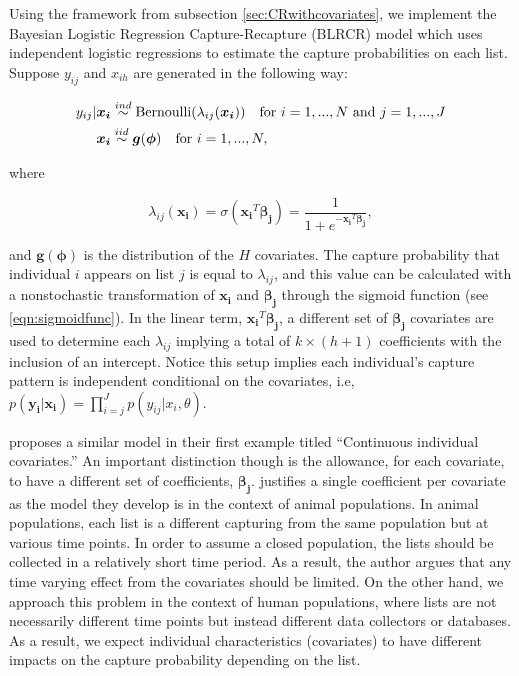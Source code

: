 \documentclass[
  12pt,
]{article}
\begin{document}
Using the framework from subsection \ref{sec:CRwithcovariates}, we
implement the Bayesian Logistic Regression Capture-Recapture (BLRCR)
model which uses independent logistic regressions to estimate the
capture probabilities on each list. Suppose \(y_{ij}\) and \(x_{ih}\)
are generated in the following way:

\begin{align} 
\label{eqn:logitdatacreation}
y_{ij}|\boldsymbol{x_i}& \stackrel{ind}{\sim} \text{Bernoulli}(\lambda_{ij}(\boldsymbol{x_i})) \hspace{10px} \text{for } i=1,...,N \text{ and } j=1,...,J\\  
\boldsymbol{x_{i}} & \stackrel{iid}{\sim} \boldsymbol{g}(\boldsymbol{\phi}) \hspace{10px} \text{for } i=1,...,N,
\end{align}

where

\begin{equation}
\label{eqn:sigmoidfunc}
\lambda_{ij}(\boldsymbol{x_i})=\sigma(\boldsymbol{x_i}^T\boldsymbol{\beta_j}) = \frac{1}{1+e^{-\boldsymbol{x_i}^T\boldsymbol{\beta_j}}},
\end{equation}

and \(\boldsymbol{g}(\boldsymbol{\phi})\) is the distribution of the
\(H\) covariates. The capture probability that individual \(i\) appears
on list \(j\) is equal to \(\lambda_{ij}\), and this value can be
calculated with a nonstochastic transformation of \(\boldsymbol{x_i}\)
and \(\boldsymbol{\beta_j}\) through the sigmoid function (see
\autoref{eqn:sigmoidfunc}). In the linear term,
\(\boldsymbol{x_i}^T\boldsymbol{\beta_j}\), a different set of
\(\boldsymbol{\beta_j}\) covariates are used to determine each
\(\lambda_{ij}\) implying a total of \(k\times(h+1)\) coefficients with
the inclusion of an intercept. Notice this setup implies each
individual's capture pattern is independent conditional on the
covariates, i.e,
\(p(\boldsymbol{y_i}|\boldsymbol{x_i}) = \prod_{i=j}^J p(y_{ij}|x_{i},\theta)\).

\cite{king_capturerecapture_2016} proposes a similar model in their
first example titled ``Continuous individual covariates.'' An important
distinction though is the allowance, for each covariate, to have a
different set of coefficients, \(\boldsymbol{\beta_j}\).
\cite{king_capturerecapture_2016} justifies a single coefficient per
covariate as the model they develop is in the context of animal
populations. In animal populations, each list is a different capturing
from the same population but at various time points. In order to assume
a closed population, the lists should be collected in a relatively short
time period. As a result, the author argues that any time varying effect
from the covariates should be limited. On the other hand, we approach
this problem in the context of human populations, where lists are not
necessarily different time points but instead different data collectors
or databases. As a result, we expect individual characteristics
(covariates) to have different impacts on the capture probability
depending on the list.
\end{document}
